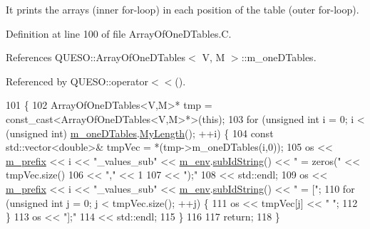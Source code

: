 It prints the arrays (inner for-\/loop) in each position of the table (outer for-\/loop). 

Definition at line 100 of file Array\-Of\-One\-D\-Tables.\-C.



References Q\-U\-E\-S\-O\-::\-Array\-Of\-One\-D\-Tables$<$ V, M $>$\-::m\-\_\-one\-D\-Tables.



Referenced by Q\-U\-E\-S\-O\-::operator$<$$<$().


\begin{DoxyCode}
101 \{
102   ArrayOfOneDTables<V,M>* tmp = \textcolor{keyword}{const\_cast<}ArrayOfOneDTables<V,M>*\textcolor{keyword}{>}(\textcolor{keyword}{this});
103   \textcolor{keywordflow}{for} (\textcolor{keywordtype}{unsigned} \textcolor{keywordtype}{int} i = 0; i < (\textcolor{keywordtype}{unsigned} int) \hyperlink{class_q_u_e_s_o_1_1_array_of_one_d_tables_ad5e13befcb2e58dde1c13e396388a696}{m\_oneDTables}.\hyperlink{class_q_u_e_s_o_1_1_dist_array_af4a798f5defa6a37dfc82175c7f92f83}{MyLength}(); ++i) \{
104     \textcolor{keyword}{const} std::vector<double>& tmpVec = *(tmp->m\_oneDTables(i,0));
105     os << \hyperlink{class_q_u_e_s_o_1_1_array_of_one_d_tables_ae9bfd81e226ee5712cd160031f96d4d2}{m\_prefix} << i << \textcolor{stringliteral}{"\_values\_sub"} << \hyperlink{class_q_u_e_s_o_1_1_array_of_one_d_tables_a51d23742e1c418efc4e829cb06fcda76}{m\_env}.\hyperlink{class_q_u_e_s_o_1_1_base_environment_a73f7849acdd5d5ba15a3094fe18f258f}{subIdString}() << \textcolor{stringliteral}{" = zeros("} << 
      tmpVec.size()
106        << \textcolor{stringliteral}{","}                                                                  << 1
107        << \textcolor{stringliteral}{");"}
108        << std::endl;
109     os << \hyperlink{class_q_u_e_s_o_1_1_array_of_one_d_tables_ae9bfd81e226ee5712cd160031f96d4d2}{m\_prefix} << i << \textcolor{stringliteral}{"\_values\_sub"} << \hyperlink{class_q_u_e_s_o_1_1_array_of_one_d_tables_a51d23742e1c418efc4e829cb06fcda76}{m\_env}.\hyperlink{class_q_u_e_s_o_1_1_base_environment_a73f7849acdd5d5ba15a3094fe18f258f}{subIdString}() << \textcolor{stringliteral}{" = ["};
110     \textcolor{keywordflow}{for} (\textcolor{keywordtype}{unsigned} \textcolor{keywordtype}{int} j = 0; j < tmpVec.size(); ++j) \{
111       os << tmpVec[j] << \textcolor{stringliteral}{" "};
112     \}
113     os << \textcolor{stringliteral}{"];"}
114        << std::endl;
115   \}
116 
117   \textcolor{keywordflow}{return};
118 \}
\end{DoxyCode}
